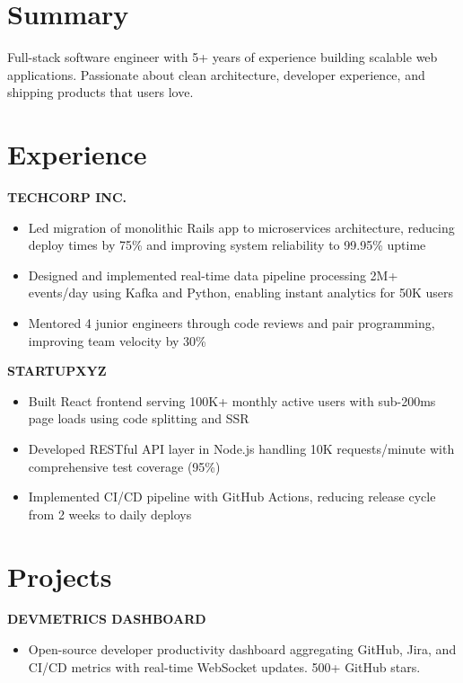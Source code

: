 \documentclass[letterpaper,10pt]{article}
\newcommand{\runsubsection}[1]{
  \color{subheadings}\fontsize{11pt}{13pt}\selectfont\bfseries\uppercase{#1}\normalfont
}
\newcommand{\descript}[1]{
  \color{subheadings}\raggedright\scshape\fontsize{10pt}{12pt}\selectfont{#1\\}\normalfont
}
\newcommand{\location}[1]{
  \color{headings}\raggedright\fontsize{9pt}{11pt}\selectfont{#1\\}\normalfont
}
\newenvironment{tightitemize}{
  \vspace{2pt}\begin{itemize}[leftmargin=12pt]\itemsep1pt \parskip0pt \parsep0pt
}{
  \end{itemize}\vspace{-\topsep}
}
\newcommand{\sectionsep}{\vspace{6pt}}
\begin{document}
\begin{minipage}[t]{0.66\textwidth}

\section{Summary}
\small{Full-stack software engineer with 5+ years of experience building scalable web applications. Passionate about clean architecture, developer experience, and shipping products that users love.}
\sectionsep

\section{Experience}

\runsubsection{TechCorp Inc.}
\descript{| Senior Software Engineer}
\location{2022-03 -- Present | San Francisco, CA}
\begin{tightitemize}
\item Led migration of monolithic Rails app to microservices architecture, reducing deploy times by 75\% and improving system reliability to 99.95\% uptime
\item Designed and implemented real-time data pipeline processing 2M+ events/day using Kafka and Python, enabling instant analytics for 50K users
\item Mentored 4 junior engineers through code reviews and pair programming, improving team velocity by 30\%
\end{tightitemize}
\sectionsep

\runsubsection{StartupXYZ}
\descript{| Software Engineer}
\location{2019-06 -- 2022-02 | Remote}
\begin{tightitemize}
\item Built React frontend serving 100K+ monthly active users with sub-200ms page loads using code splitting and SSR
\item Developed RESTful API layer in Node.js handling 10K requests/minute with comprehensive test coverage (95\%)
\item Implemented CI/CD pipeline with GitHub Actions, reducing release cycle from 2 weeks to daily deploys
\end{tightitemize}
\sectionsep

\section{Projects}

\runsubsection{DevMetrics Dashboard}
\descript{| React, Go, PostgreSQL, WebSocket}
\begin{tightitemize}
\item Open-source developer productivity dashboard aggregating GitHub, Jira, and CI/CD metrics with real-time WebSocket updates. 500+ GitHub stars.
\end{tightitemize}
\sectionsep

\end{minipage}
\end{document}
